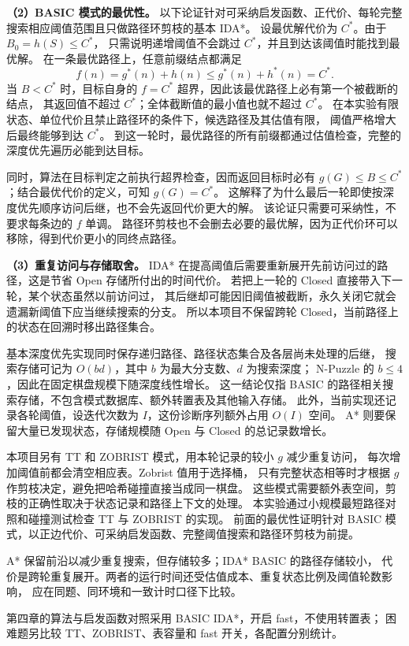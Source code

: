\textbf{（2）BASIC 模式的最优性。}
以下论证针对可采纳启发函数、正代价、每轮完整搜索相应阈值范围且只做路径环剪枝的基本 IDA*。
设最优解代价为 $C^*$。由于 $B_0=h(S)\leq C^*$，
只需说明递增阈值不会跳过 $C^*$，并且到达该阈值时能找到最优解。
在一条最优路径上，任意前缀结点都满足
\begin{equation}
  f(n)=g^*(n)+h(n)\leq g^*(n)+h^*(n)=C^*.
  \label{eq:overview-ida-optimal}
\end{equation}
当 $B<C^*$ 时，目标自身的 $f=C^*$ 超界，因此该最优路径上必有第一个被截断的结点，
其返回值不超过 $C^*$；全体截断值的最小值也就不超过 $C^*$。
在本实验有限状态、单位代价且禁止路径环的条件下，候选路径及其估值有限，
阈值严格增大后最终能够到达 $C^*$。
到这一轮时，最优路径的所有前缀都通过估值检查，完整的深度优先遍历必能到达目标。

同时，算法在目标判定之前执行超界检查，因而返回目标时必有
$g(G)\leq B\leq C^*$；结合最优代价的定义，可知 $g(G)=C^*$。
这解释了为什么最后一轮即使按深度优先顺序访问后继，也不会先返回代价更大的解。
该论证只需要可采纳性，不要求每条边的 $f$ 单调。
路径环剪枝也不会删去必要的最优解，因为正代价环可以移除，得到代价更小的同终点路径。
\FloatBarrier

\textbf{（3）重复访问与存储取舍。}
IDA* 在提高阈值后需要重新展开先前访问过的路径，这是节省 Open 存储所付出的时间代价。
若把上一轮的 Closed 直接带入下一轮，某个状态虽然以前访问过，
其后继却可能因旧阈值被截断，永久关闭它就会遗漏新阈值下应当继续搜索的分支。
所以本项目不保留跨轮 Closed，当前路径上的状态在回溯时移出路径集合。

基本深度优先实现同时保存递归路径、路径状态集合及各层尚未处理的后继，
搜索存储可记为 $O(bd)$，其中 $b$ 为最大分支数、$d$ 为搜索深度；
N-Puzzle 的 $b\leq4$，因此在固定棋盘规模下随深度线性增长。
这一结论仅指 BASIC 的路径相关搜索存储，不包含模式数据库、额外转置表及其他输入存储。
此外，当前实现还记录各轮阈值，设迭代次数为 $I$，这份诊断序列额外占用 $O(I)$ 空间。
A* 则要保留大量已发现状态，存储规模随 Open 与 Closed 的总记录数增长。

本项目另有 TT 和 ZOBRIST 模式，用本轮记录的较小 $g$ 减少重复访问，
每次增加阈值前都会清空相应表。Zobrist 值用于选择桶，
只有完整状态相等时才根据 $g$ 作剪枝决定，避免把哈希碰撞直接当成同一棋盘。
这些模式需要额外表空间，剪枝的正确性取决于状态记录和路径上下文的处理。
本实验通过小规模最短路径对照和碰撞测试检查 TT 与 ZOBRIST 的实现。
前面的最优性证明针对 BASIC 模式，以正边代价、可采纳启发函数、完整阈值搜索和路径环剪枝为前提。

A* 保留前沿以减少重复搜索，但存储较多；IDA* BASIC 的路径存储较小，
代价是跨轮重复展开。两者的运行时间还受估值成本、重复状态比例及阈值轮数影响，
应在同题、同环境和一致计时口径下比较。

第四章的算法与启发函数对照采用 BASIC IDA*，开启 fast，不使用转置表；
困难题另比较 TT、ZOBRIST、表容量和 fast 开关，各配置分别统计。

\endgroup
\clearpage
